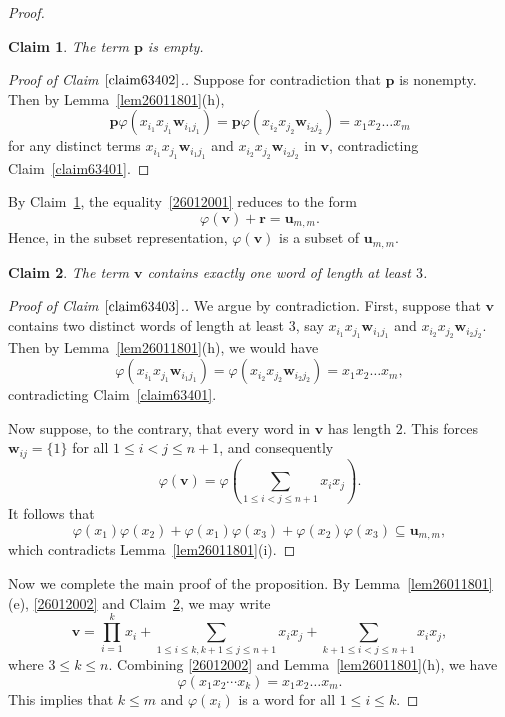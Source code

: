\documentclass[reqno]{amsart}
\theoremstyle{plain}
\newtheorem{claim}{Claim}[section]
\theoremstyle{definition}
\newcommand{\bp}{\mathbf{p}}
\newcommand{\br}{\mathbf{r}}
\newcommand{\bu}{\mathbf{u}}
\newcommand{\bv}{\mathbf{v}}
\newcommand{\bw}{\mathbf{w}}
\begin{document}
\begin{proof}
\begin{claim}\label{claim63402}
The term $\bp$ is empty.
\end{claim}
\begin{proof}[Proof of Claim $\ref{claim63402}$.]
Suppose for contradiction that $\bp$ is nonempty.
Then by Lemma~\ref{lem26011801}(h),
\[
\bp\varphi(x_{i_1}x_{j_1}\bw_{i_1j_1})=\bp\varphi(x_{i_2}x_{j_2}\bw_{i_2j_2})=x_1x_2\dots x_m
\]
for any distinct terms $x_{i_1}x_{j_1}\bw_{i_1j_1}$ and $x_{i_2}x_{j_2}\bw_{i_2j_2}$ in $\bv$,
contradicting Claim~\ref{claim63401}.
\end{proof}

By Claim~\ref{claim63402}, the equality~\eqref{26012001} reduces to the form
\begin{equation}\label{26012002}
\varphi(\bv)+\br=\bu_{m,m}.
\end{equation}
Hence, in the subset representation, $\varphi(\bv)$ is a subset of $\bu_{m,m}$.

\begin{claim}\label{claim63403}
The term $\bv$ contains exactly one word of length at least $3$.
\end{claim}
\begin{proof}[Proof of Claim $\ref{claim63403}$.]
We argue by contradiction. First, suppose that $\bv$ contains two distinct words of length at least $3$,
say $x_{i_1}x_{j_1}\bw_{i_1j_1}$ and $x_{i_2}x_{j_2}\bw_{i_2j_2}$.
Then by Lemma~\ref{lem26011801}(h), we would have
\[
\varphi(x_{i_1}x_{j_1}\bw_{i_1j_1})=\varphi(x_{i_2}x_{j_2}\bw_{i_2j_2})=x_1x_2\dots x_m,
\]
contradicting Claim~\ref{claim63401}.

Now suppose, to the contrary, that every word in $\bv$ has length $2$.
This forces $\bw_{ij}=\{1\}$ for all $1\leq i<j\leq n+1$, and consequently
\[
\varphi(\bv)=\varphi\left(\sum_{1\leq i<j\leq n+1}x_ix_j\right).
\]
It follows that
\[
\varphi(x_1)\varphi(x_2)+\varphi(x_1)\varphi(x_3)+\varphi(x_2)\varphi(x_3)\subseteq \bu_{m,m},
\]
which contradicts Lemma~\ref{lem26011801}(i).
\end{proof}

Now we complete the main proof of the proposition.
By Lemma~\ref{lem26011801}(e), \eqref{26012002} and Claim~\ref{claim63403}, we may write
\begin{equation}\label{26012601}
\bv=
\prod_{i=1}^k x_i+\sum_{1\leq i\leq k, k+1\leq j\leq n+1}x_ix_j+\sum_{k+1\leq i<j\leq n+1}x_ix_j,
\end{equation}
where $3\leq k\leq n$.
Combining \eqref{26012002} and Lemma~\ref{lem26011801}(h), we have
\begin{equation}\label{26012503}
\varphi(x_1x_2\cdots x_k)=x_1x_2\dots x_m.
\end{equation}
This implies that $k\leq m$ and $\varphi(x_i)$ is a word for all $1\leq i\leq k$.


\end{proof}
\end{document}
